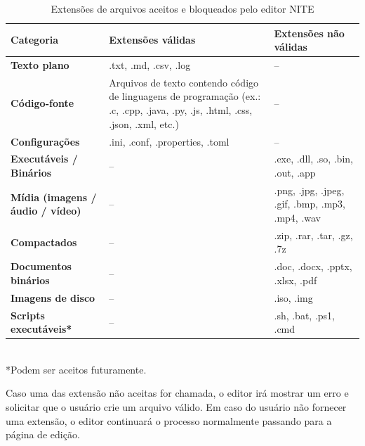 \begin{table}[h]
    \centering
    \caption{Extensões de arquivos aceitos e bloqueados pelo editor NITE}
    \renewcommand{\arraystretch}{1.3}
    \setlength{\tabcolsep}{8pt}
    \begin{tabular}{@{}p{3.5cm}p{5.2cm}p{5.2cm}@{}}
        \toprule
        \textbf{Categoria} &
        \textbf{Extensões válidas} &
        \textbf{Extensões não válidas} \\
        \midrule
        \textbf{Texto plano} &
        .txt, .md, .csv, .log &
        – \\

        \textbf{Código-fonte} &
        Arquivos de texto contendo código de linguagens de programação
        (ex.: .c, .cpp, .java, .py, .js, .html, .css, .json, .xml, etc.) &
        – \\

        \textbf{Configurações} &
        .ini, .conf, .properties, .toml &
        – \\

        \textbf{Executáveis / Binários} &
        – &
        .exe, .dll, .so, .bin, .out, .app \\

        \textbf{Mídia (imagens / áudio / vídeo)} &
        – &
        .png, .jpg, .jpeg, .gif, .bmp, .mp3, .mp4, .wav \\

        \textbf{Compactados} &
        – &
        .zip, .rar, .tar, .gz, .7z \\

        \textbf{Documentos binários} &
        – &
        .doc, .docx, .pptx, .xlsx, .pdf \\

        \textbf{Imagens de disco} &
        – &
        .iso, .img \\

        \textbf{Scripts executáveis*} &
        – &
        .sh, .bat, .ps1, .cmd \\
        \bottomrule
    \end{tabular}

    \footnotesize\\[0.5em]
    *Podem ser aceitos futuramente.
\end{table}

Caso uma das extensão não aceitas for chamada, o editor irá mostrar um erro e solicitar que o usuário crie um arquivo válido. Em caso do usuário
não fornecer uma extensão, o editor continuará o processo normalmente passando para a página de edição.

